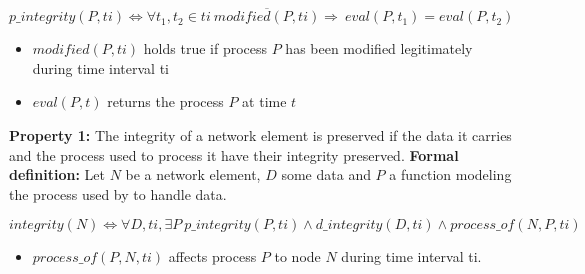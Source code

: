 \begin{myformula}
$p\_integrity(P, ti) \Leftrightarrow \forall t_1,t_2 \in ti~ \overline{modified(P, ti)}\Rightarrow 
~eval(P,t_1)=eval(P,t_2) $
\end{myformula}

\begin{itemize}
\item $modified(P,ti)$ holds true if process $P$ has been modified legitimately during time interval ti
\item $eval(P,t)$ returns the process $P$ at time $t$
\end{itemize}


\textbf{Property 1:} The integrity of a network element is preserved if the data it carries and the process used to process it have their integrity preserved. 
\newline
\textbf{Formal definition:} Let $N$ be a network element, $D$ some data and $P$ a function modeling the process used by to handle data.

\begin{myformula}
$integrity(N) \Leftrightarrow \forall D,ti,\exists P~p\_integrity(P,ti) \wedge d\_integrity(D,ti) \wedge process\_of(N,P,ti)$
\end{myformula}

\begin{itemize}
\item $process\_of(P,N,ti)$ affects process $P$ to node $N$ during time interval ti.
\end{itemize}



